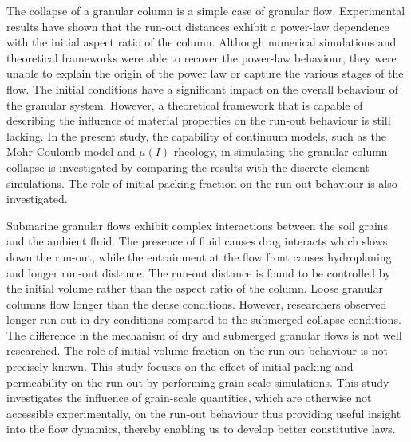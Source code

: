 The collapse of a granular column is a simple case of granular flow. 
Experimental results have shown that the run-out distances exhibit a power-law 
dependence with the initial aspect ratio of the column. Although numerical 
simulations and theoretical frameworks were able to recover the power-law 
behaviour, they were unable to explain the origin of the power law or capture 
the various stages of the flow. The initial conditions have a significant 
impact on the overall behaviour of the granular system. However, a theoretical 
framework that is capable of describing the influence of material properties on 
the run-out behaviour is still lacking. In the present study, the capability of 
continuum models, such as the Mohr-Coulomb model and $\mu(I)$ rheology, in 
simulating the granular column collapse is investigated by comparing the 
results with the discrete-element simulations. The role of initial packing 
fraction on the run-out behaviour is also investigated.

Submarine granular flows exhibit complex interactions between the soil grains 
and the ambient fluid. The presence of fluid causes drag interacts which slows 
down the run-out, while the entrainment at the flow front causes hydroplaning 
and longer run-out distance. The run-out distance is found to be controlled by 
the initial volume rather than the aspect ratio of the column. Loose granular 
columns flow longer than the dense conditions. However, researchers 
observed longer run-out in dry conditions compared to the submerged 
collapse conditions. The difference in the mechanism of dry and submerged 
granular flows is not well researched. The role of initial volume fraction on 
the run-out behaviour is not precisely known. This study focuses on the effect 
of initial packing and permeability on the run-out by performing grain-scale 
simulations. This study investigates the influence of grain-scale quantities, 
which are otherwise not accessible experimentally, on the run-out behaviour 
thus providing useful insight into the flow dynamics, thereby enabling us to 
develop better constitutive laws. 